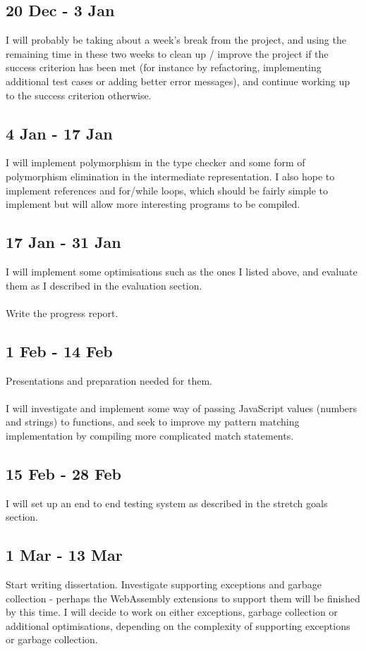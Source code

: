 	\subsection*{20 Dec - 3 Jan}
	I will probably be taking about a week's break from the project, and using the remaining time in these two weeks to clean up / improve the project if the success criterion has been met (for instance by refactoring, implementing additional test cases or adding better error messages), and continue working up to the success criterion otherwise.
	
	\subsection*{4 Jan - 17 Jan}
	I will implement polymorphism in the type checker and some form of polymorphism elimination in the intermediate representation. I also hope to implement references and for/while loops, which should be fairly simple to implement but will allow more interesting programs to be compiled.
	
	\subsection*{17 Jan - 31 Jan}
	I will implement some optimisations such as the ones I listed above, and evaluate them as I described in the evaluation section.
	\\\\
	Write the progress report.
	
	\subsection*{1 Feb - 14 Feb}
	Presentations and preparation needed for them.
	\\\\
	I will investigate and implement some way of passing JavaScript values (numbers and strings) to functions, and seek to improve my pattern matching implementation by compiling more complicated match statements.
	
	\subsection*{15 Feb - 28 Feb}
	I will set up an end to end testing system as described in the stretch goals section.
	
	\subsection*{1 Mar - 13 Mar}
	Start writing dissertation. Investigate supporting exceptions and garbage collection - perhaps the WebAssembly extensions to support them will be finished by this time. I will decide to work on either exceptions, garbage collection or additional optimisations, depending on the complexity of supporting exceptions or garbage collection.
	
